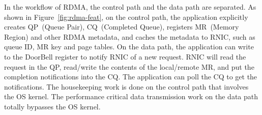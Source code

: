 In the workflow of RDMA, the control path and the data path are separated. As shown in Figure~\ref{fig:rdma-feat}, on the control path, the application explicitly creates QP~(Queue Pair), CQ~(Completed Queue), registers MR~(Memory Region) and other RDMA metadata, and caches the metadata to RNIC, such as queue ID, MR key and page tables. On the data path, the application can write to the DoorBell register to notify RNIC of a new request. RNIC will read the request in the QP, read/write the contents of the local/remote MR, and put the completion notifications into the CQ. The application can poll the CQ to get the notifications. The housekeeping work is done on the control path that involves the OS kernel. The performance critical data transmission work on the data path totally bypasses the OS kernel.